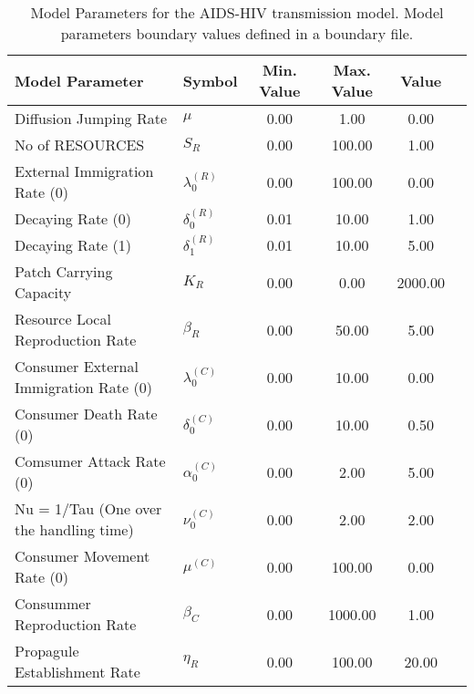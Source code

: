 \begin{table}
\centering
\begin{tabular}{p{5cm}lcccc}
{\bf Model Parameter} & {\bf Symbol} & {\bf Min. Value} & {\bf Max. Value} & {\bf Value}\\
\hline\hline
Diffusion Jumping Rate & $\mu$ & 0.00 & 1.00 & 0.00\\
No of RESOURCES & $S_R$ & 0.00 & 100.00 & 1.00\\
External Immigration Rate (0) & $\lambda^{(R)}_0$ & 0.00 & 100.00 & 0.00\\
Decaying Rate (0) & $\delta^{(R)}_0$ & 0.01 & 10.00 & 1.00\\
Decaying Rate (1) & $\delta^{(R)}_1$ & 0.01 & 10.00 & 5.00\\
Patch Carrying Capacity & $K_R$ & 0.00 & 0.00 & 2000.00\\
Resource Local Reproduction Rate & $\beta_R$ & 0.00 & 50.00 & 5.00\\
Consumer External Immigration Rate (0) & $\lambda^{(C)}_0$ & 0.00 & 10.00 & 0.00\\
Consumer Death Rate (0) & $\delta^{(C)}_0$ & 0.00 & 10.00 & 0.50\\
Comsumer Attack Rate (0) & $\alpha^{(C)}_0$ & 0.00 & 2.00 & 5.00\\
Nu = 1/Tau (One over the handling time) & $\nu^{(C)}_0$ & 0.00 & 2.00 & 2.00\\
Consumer Movement Rate (0) & $\mu^{(C)}$ & 0.00 & 100.00 & 0.00\\
Consummer Reproduction Rate & $\beta_C$ & 0.00 & 1000.00 & 1.00\\
Propagule Establishment Rate & $\eta_R$ & 0.00 & 100.00 & 20.00\\
\hline\hline
\end{tabular}
\caption{Model Parameters for the AIDS-HIV transmission model. Model parameters boundary values defined in a boundary file.}
\end{table}

